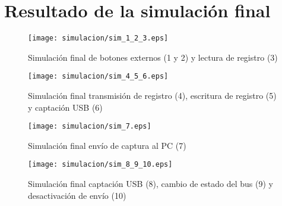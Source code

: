 \chapter{Resultado de la simulación final}
\label{ch:simulacion-final}

\begin{figure}[htbp]
    \centering
    \texttt{[image: simulacion/sim\_1\_2\_3.eps]}
    \caption{Simulación final de botones externos (1 y 2) y lectura de registro (3)}
    \label{fig:simulacion_1_2_3}
\end{figure}

\begin{figure}[htbp]
    \centering
    \texttt{[image: simulacion/sim\_4\_5\_6.eps]}
    \caption{Simulación final transmisión de registro (4), escritura de registro (5) y captación USB (6)}
    \label{fig:simulacion_4_5_6}
\end{figure}

\begin{figure}[htbp]
    \centering
    \texttt{[image: simulacion/sim\_7.eps]}
    \caption{Simulación final envío de captura al PC (7)}
    \label{fig:simulacion_7}
\end{figure}

\begin{figure}[htbp]
    \centering
    \texttt{[image: simulacion/sim\_8\_9\_10.eps]}
    \caption{Simulación final captación USB (8), cambio de estado del bus (9) y desactivación de envío (10)}
    \label{fig:simulacion_8_9_10}
\end{figure}
